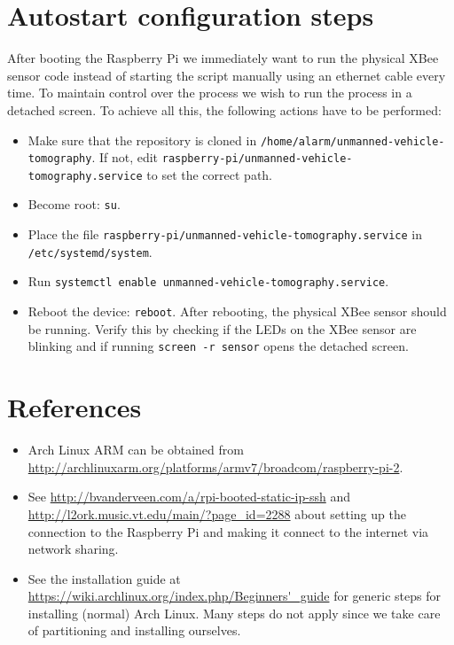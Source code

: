 \documentclass{article}
\begin{document}
\section{Autostart configuration steps}
After booting the Raspberry Pi we immediately want to run the physical XBee
sensor code instead of starting the script manually using an ethernet cable
every time. To maintain control over the process we wish to run the process
in a detached screen. To achieve all this, the following actions have to be
performed:

\begin{itemize}
    \item Make sure that the repository is cloned in
          {\tt /home/alarm/unmanned-vehicle-tomography}. If not, edit
          {\tt raspberry-pi/unmanned-vehicle-tomography.service} to set the
          correct path.
    \item Become root: {\tt su}.
    \item Place the file {\tt raspberry-pi/unmanned-vehicle-tomography.service} in
          {\tt /etc/systemd/system}.
    \item Run {\tt systemctl enable unmanned-vehicle-tomography.service}.
    \item Reboot the device: {\tt reboot}. After rebooting, the physical
          XBee sensor should be running. Verify this by checking if the LEDs on
          the XBee sensor are blinking and if running {\tt screen -r sensor}
          opens the detached screen.
\end{itemize}

\section{References}
\begin{itemize}
    \item Arch Linux ARM can be obtained from \url{http://archlinuxarm.org/platforms/armv7/broadcom/raspberry-pi-2}.
    \item See \url{http://bvanderveen.com/a/rpi-booted-static-ip-ssh} and 
          \url{http://l2ork.music.vt.edu/main/?page_id=2288} about setting up 
          the connection to the Raspberry Pi and making it connect to the 
          internet via network sharing.
    \item See the installation guide at 
          \url{https://wiki.archlinux.org/index.php/Beginners'_guide} for 
          generic steps for installing (normal) Arch Linux. Many steps do not 
          apply since we take care of partitioning and installing ourselves.
\end{itemize}
\end{document}
